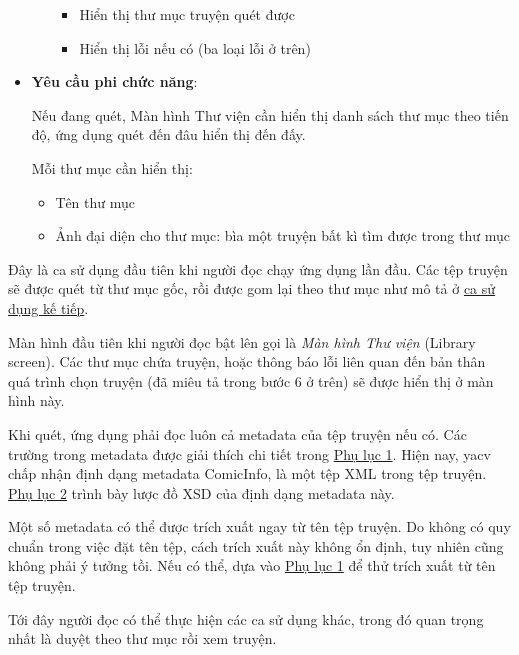 \documentclass[../../thesis]{subfiles}
\begin{document}
\begin{itemize}
\begin{itemize}
                \begin{itemize}
                    \item
                        Hiển thị thư mục truyện quét được
                    \item
                        Hiển thị lỗi nếu có (ba loại lỗi ở trên)
                \end{itemize}
          \end{itemize}
    \item
        \textbf{Yêu cầu phi chức năng}:

        Nếu đang quét, Màn hình Thư viện cần hiển thị danh sách thư mục theo
        tiến độ, ứng dụng quét đến đâu hiển thị đến đấy.

        Mỗi thư mục cần hiển thị:

        \begin{itemize}
            \item
                Tên thư mục
            \item
                Ảnh đại diện cho thư mục: bìa một truyện bất kì tìm được trong
                thư mục
        \end{itemize}
\end{itemize}

Đây là ca sử dụng đầu tiên khi người đọc chạy ứng dụng lần đầu. Các tệp truyện
sẽ được quét từ thư mục gốc, rồi được gom lại theo thư mục như mô tả ở
\protect\hyperlink{P3.3.2-show-library}{ca sử dụng kế tiếp}.

Màn hình đầu tiên khi người đọc bật lên gọi là \emph{Màn hình Thư viện} (Library
screen). Các thư mục chứa truyện, hoặc thông báo lỗi liên quan đến bản thân quá
trình chọn truyện (đã miêu tả trong bước 6 ở trên) sẽ được hiển thị ở màn hình
này.

Khi quét, ứng dụng phải đọc luôn cả metadata của tệp truyện nếu có. Các trường
trong metadata được giải thích chi tiết trong
\protect\hyperlink{P8.1-metadata}{Phụ lục 1}. Hiện nay, yacv chấp nhận định dạng
metadata ComicInfo, là một tệp XML trong tệp truyện.
\protect\hyperlink{P8.2-comicinfo.xsd}{Phụ lục 2} trình bày lược đồ XSD của định
dạng metadata này.

Một số metadata có thể được trích xuất ngay từ tên tệp truyện. Do không có quy
chuẩn trong việc đặt tên tệp, cách trích xuất này không ổn định, tuy nhiên cũng
không phải ý tưởng tồi. Nếu có thể, dựa vào
\protect\hyperlink{P8.1-metadata}{Phụ lục 1} để thử trích xuất từ tên tệp
truyện.

Tới đây người đọc có thể thực hiện các ca sử dụng khác, trong đó quan trọng nhất
là duyệt theo thư mục rồi xem truyện.
\end{document}
